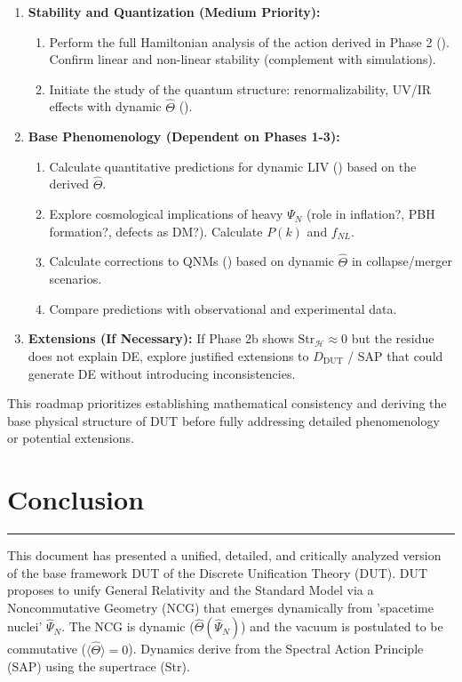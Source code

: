 \documentclass[11pt, a4paper]{article}
\theoremstyle{remark}
\newcommand{\Op}[1]{\hat{#1}}
\newcommand{\Str}{\mathrm{Str}}
\begin{document}
\begin{enumerate}[label=\textbf{Phase \arabic*}:, wide, labelwidth=!, labelindent=0pt, itemsep=2pt, topsep=3pt]
\begin{enumerate}[label=\alph*), itemsep=1pt]
        \end{enumerate}
    \item \textbf{Stability and Quantization (Medium Priority):}
        \begin{enumerate}[label=\alph*), itemsep=1pt]
            \item Perform the full Hamiltonian analysis of the action derived in Phase 2 (). Confirm linear and non-linear stability (complement with simulations).
            \item Initiate the study of the quantum structure: renormalizability, UV/IR effects with dynamic \( \Op{\Theta} \) ().
        \end{enumerate}
    \item \textbf{Base Phenomenology (Dependent on Phases 1-3):}
        \begin{enumerate}[label=\alph*), itemsep=1pt]
            \item Calculate quantitative predictions for dynamic LIV () based on the derived \( \Op{\Theta} \).
            \item Explore cosmological implications of heavy \( \Psi_N \) (role in inflation?, PBH formation?, defects as DM?). Calculate \( P(k) \) and \( f_{NL} \).
            \item Calculate corrections to QNMs () based on dynamic \( \Op{\Theta} \) in collapse/merger scenarios.
            \item Compare predictions with observational and experimental data.
        \end{enumerate}
    \item \textbf{Extensions (If Necessary):} If Phase 2b shows \( \Str_{\mathcal{H}} \approx 0 \) but the residue does not explain DE, explore justified extensions to \( D_{\text{DUT}} \) / SAP that could generate DE without introducing inconsistencies.
\end{enumerate}
This roadmap prioritizes establishing mathematical consistency and deriving the base physical structure of DUT before fully addressing detailed phenomenology or potential extensions.

\section{Conclusion}
\label{sec:conclusion_final_shifted}

\hrule
This document has presented a unified, detailed, and critically analyzed version of the base framework DUT of the Discrete Unification Theory (DUT). DUT proposes to unify General Relativity and the Standard Model via a Noncommutative Geometry (NCG) that emerges dynamically from 'spacetime nuclei' \( \Op{\Psi}_N \). The NCG is dynamic (\( \Op{\Theta}(\Op{\Psi}_N) \)) and the vacuum is postulated to be commutative (\( \langle \Op{\Theta} \rangle = 0 \)). Dynamics derive from the Spectral Action Principle (SAP) using the supertrace (\( \Str \)).
\end{document}
